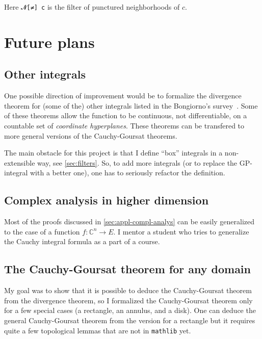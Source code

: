 \documentclass[a4paper, UKenglish,cleveref, autoref, thm-restate]{lipics-v2021}
\newcommand{\bbC}{\mathbb{C}}
\begin{document}
Here \lstinline{𝓝[≠] c} is the filter of punctured neighborhoods of
\(c\).

\section{Future plans}\label{sec:future-plans}

\subsection{Other integrals}\label{sec:other-integrals}

One possible direction of improvement would be to formalize the
divergence theorem for (some of the) other integrals listed in the
Bongiorno's survey~\cite{BONGIORNO2002587}. Some of these theorems
allow the function to be continuous, not differentiable, on a
countable set of \emph{coordinate hyperplanes}. These theorems can be
transfered to more general versions of the Cauchy-Goursat theorems.

The main obstacle for this project is that I define \enquote{box}
integrals in a non-extensible way, see \autoref{sec:filters}. So, to
add more integrals (or to replace the GP-integral with a better one),
one has to seriously refactor the definition.

\subsection{Complex analysis in higher dimension}%
\label{sec:compl-analys-high}

Most of the proofs discussed in \autoref{sec:appl-compl-analys} can be
easily generalized to the case of a function
\(f\colon \bbC^{n}\to E\). I mentor a student who tries to generalize
the Cauchy integral formula as a part of a course.

\subsection{The Cauchy-Goursat theorem for any domain}\label{sec:cauchy-goursat-any}

My goal was to show that it is possible to deduce the Cauchy-Goursat
theorem from the divergence theorem, so I formalized the
Cauchy-Goursat theorem only for a few special cases (a rectangle, an
annulus, and a disk). One can deduce the general Cauchy-Goursat
theorem from the version for a rectangle but it requires quite a few
topological lemmas that are not in \texttt{mathlib} yet.
\end{document}
